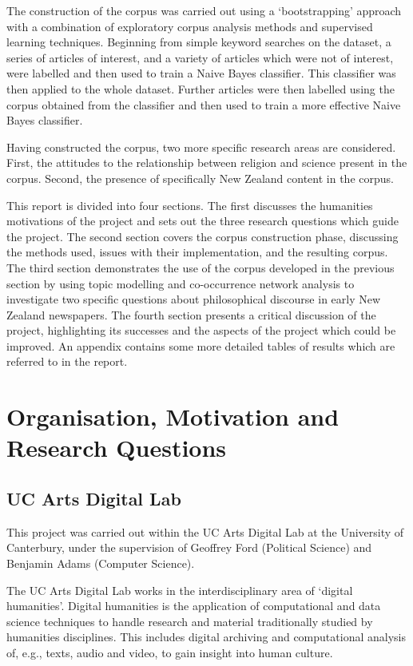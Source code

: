 \documentclass{article}
\begin{document}
The construction of the corpus was carried out using a `bootstrapping' approach with a combination of exploratory corpus analysis methods and supervised learning techniques. Beginning from simple keyword searches on the dataset, a series of articles of interest, and a variety of articles which were not of interest, were labelled and then used to train a Naive Bayes classifier. This classifier was then applied to the whole dataset. Further articles were then labelled using the corpus obtained from the classifier and then used to train a more effective Naive Bayes classifier.

Having constructed the corpus, two more specific research areas are considered. First, the attitudes to the relationship between religion and science present in the corpus. Second, the presence of specifically New Zealand content in the corpus.

This report is divided into four sections. The first discusses the humanities motivations of the project and sets out the three research questions which guide the project. The second section covers the corpus construction phase, discussing the methods used, issues with their implementation, and the resulting corpus. The third section demonstrates the use of the corpus developed in the previous section by using topic modelling and co-occurrence network analysis to investigate two specific questions about philosophical discourse in early New Zealand newspapers. The fourth section presents a critical discussion of the project, highlighting its successes and the aspects of the project which could be improved. An appendix contains some more detailed tables of results which are referred to in the report.

\section{Organisation, Motivation and Research Questions}

\subsection{UC Arts Digital Lab}

This project was carried out within the UC Arts Digital Lab at the University of Canterbury, under the supervision of Geoffrey Ford (Political Science) and Benjamin Adams (Computer Science).

The UC Arts Digital Lab works in the interdisciplinary area of `digital humanities'. Digital humanities is the application of computational and data science techniques to handle research and material traditionally studied by humanities disciplines. This includes digital archiving and computational analysis of, e.g., texts, audio and video, to gain insight into human culture.
\end{document}
